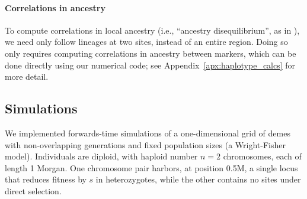 \documentclass[11pt,letterpaper]{article}
\begin{document}
\paragraph{Correlations in ancestry}
To compute correlations in local ancestry
(i.e., ``ancestry disequilibrium'', as in \citet{pool2015mosaic,Schumer2016}),
we need only follow lineages at two sites, instead of an entire region. 
Doing so only requires computing correlations in ancestry between markers,
which can be done directly using our numerical code;
see Appendix~\ref{apx:haplotype_calcs} for more detail. 


\subsection*{Simulations}

We implemented forwards-time simulations of a one-dimensional grid of demes
with non-overlapping generations and fixed population sizes (a Wright-Fisher model). Individuals are diploid, with haploid number $n=2$ chromosomes, each of length 1 Morgan. One chromosome pair harbors, at position 0.5M, a single locus that reduces fitness by $s$ in heterozygotes, while the other contains no sites under direct selection.
\end{document}
